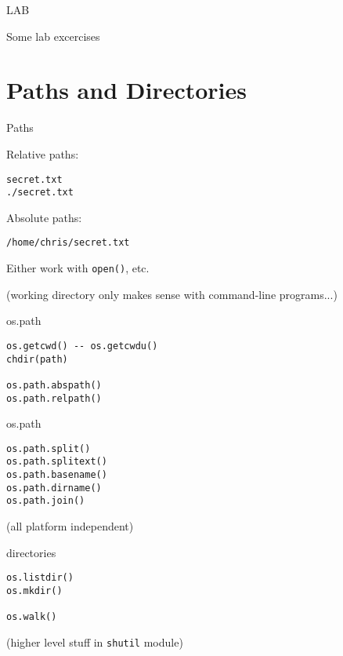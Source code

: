 \documentclass{beamer}
\begin{document}
\begin{frame}[fragile]{LAB}

\vfill
{\large Some lab excercises}
\vfill

\end{frame}


\section{Paths and Directories}

\begin{frame}[fragile]{Paths}

{\Large Relative paths:}

\begin{verbatim}
secret.txt
./secret.txt
\end{verbatim}

{\Large Absolute paths:}
\begin{verbatim}
/home/chris/secret.txt
\end{verbatim}

{\Large Either work with \verb|open()|, etc.}

\vfill
(working directory only makes sense with command-line programs...)
\end{frame}

\begin{frame}[fragile]{os.path}

\begin{verbatim}
os.getcwd() -- os.getcwdu()
chdir(path)

os.path.abspath()
os.path.relpath()￼
\end{verbatim}

\end{frame}

\begin{frame}[fragile]{os.path}

\vfill
\begin{verbatim}
os.path.split()
os.path.splitext()
os.path.basename()
os.path.dirname()
os.path.join()
\end{verbatim}

\vfill
(all platform independent)

\end{frame}


\begin{frame}[fragile]{directories}

\vfill
\begin{verbatim}
os.listdir()
os.mkdir()

os.walk()

\end{verbatim}

\vfill
(higher level stuff in \verb|shutil| module)

\end{frame}
\end{document}
